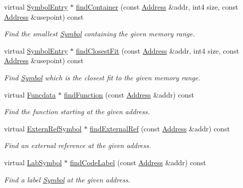 \begin{DoxyCompactItemize}
virtual \mbox{\hyperlink{class_symbol_entry}{Symbol\+Entry}} $\ast$ \mbox{\hyperlink{class_scope_ghidra_a6b5b1b303d3d6adf93822224aa7bd19f}{find\+Container}} (const \mbox{\hyperlink{class_address}{Address}} \&addr, int4 size, const \mbox{\hyperlink{class_address}{Address}} \&usepoint) const
\begin{DoxyCompactList}\small\item\em Find the smallest \mbox{\hyperlink{class_symbol}{Symbol}} containing the given memory range. \end{DoxyCompactList}\item 
virtual \mbox{\hyperlink{class_symbol_entry}{Symbol\+Entry}} $\ast$ \mbox{\hyperlink{class_scope_ghidra_ace9d46c27a627260abfe9cce2724267b}{find\+Closest\+Fit}} (const \mbox{\hyperlink{class_address}{Address}} \&addr, int4 size, const \mbox{\hyperlink{class_address}{Address}} \&usepoint) const
\begin{DoxyCompactList}\small\item\em Find \mbox{\hyperlink{class_symbol}{Symbol}} which is the closest fit to the given memory range. \end{DoxyCompactList}\item 
virtual \mbox{\hyperlink{class_funcdata}{Funcdata}} $\ast$ \mbox{\hyperlink{class_scope_ghidra_a8bc17a80d5b2bd69f7900be5b55a382a}{find\+Function}} (const \mbox{\hyperlink{class_address}{Address}} \&addr) const
\begin{DoxyCompactList}\small\item\em Find the function starting at the given address. \end{DoxyCompactList}\item 
virtual \mbox{\hyperlink{class_extern_ref_symbol}{Extern\+Ref\+Symbol}} $\ast$ \mbox{\hyperlink{class_scope_ghidra_a0de8e7d9e97f48516f8bb7b5edd4dfcd}{find\+External\+Ref}} (const \mbox{\hyperlink{class_address}{Address}} \&addr) const
\begin{DoxyCompactList}\small\item\em Find an {\itshape external} {\itshape reference} at the given address. \end{DoxyCompactList}\item 
virtual \mbox{\hyperlink{class_lab_symbol}{Lab\+Symbol}} $\ast$ \mbox{\hyperlink{class_scope_ghidra_a81328af0bc4954612d1e107e592a246a}{find\+Code\+Label}} (const \mbox{\hyperlink{class_address}{Address}} \&addr) const
\begin{DoxyCompactList}\small\item\em Find a label \mbox{\hyperlink{class_symbol}{Symbol}} at the given address. \end{DoxyCompactList}\item 

\end{DoxyCompactItemize}

